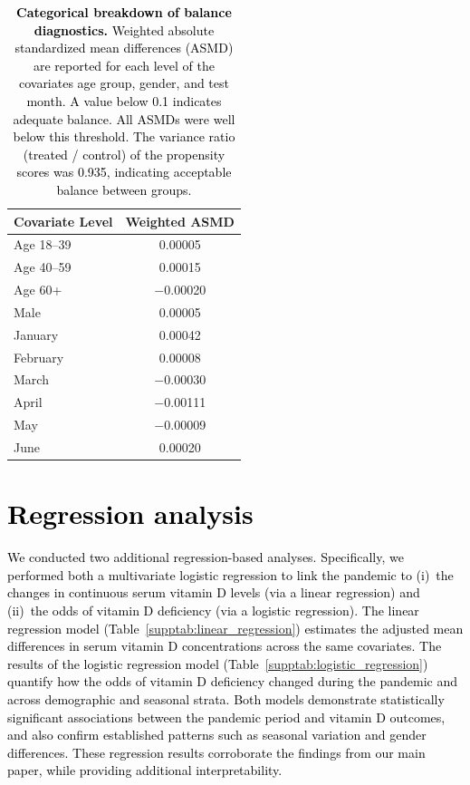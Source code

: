 \documentclass[12pt]{article}
\newcommand{\REV}[1]{\textcolor{black}{#1}}
\begin{document}
\begin{appendices}
\newpage
\begin{table}[htbp]
\centering
\caption[Categorical breakdown of balance diagnostics]{\textbf{\REV{Categorical breakdown of balance diagnostics.}} \REV{Weighted absolute standardized mean differences (ASMD) are reported for each level of the covariates age group, gender, and test month. A value below 0.1 indicates adequate balance. All ASMDs were well below this threshold. The variance ratio (treated / control) of the propensity scores was 0.935, indicating acceptable balance between groups.}}
\label{tab:balance_diagnostics}
\footnotesize
\begin{tabular}{|l|c|}
\hline
\rowcolor{orange!20}
\textbf{Covariate Level} & \textbf{Weighted ASMD} \\
\hline
Age 18--39& 0.00005 \\
Age 40--59& 0.00015 \\
Age 60+& $-$0.00020 \\
Male& 0.00005 \\
January& 0.00042 \\
February& 0.00008 \\
March& $-$0.00030 \\
April& $-$0.00111 \\
May& $-$0.00009 \\
June& 0.00020 \\
\hline
\end{tabular}
\end{table}


%
\newpage
\section{\REV{Regression analysis}}
\label{supp:linear_logistic_regression}

\REV{We conducted two additional regression-based analyses. Specifically, we performed both a multivariate logistic regression to link the pandemic to (i)~the changes in continuous serum vitamin D levels (via a linear regression) and (ii)~the odds of vitamin D deficiency (via a logistic regression). The linear regression model (Table~\ref{supptab:linear_regression}) estimates the adjusted mean differences in serum vitamin D concentrations across the same covariates. The results of the logistic regression model (Table~\ref{supptab:logistic_regression}) quantify how the odds of vitamin D deficiency changed during the pandemic and across demographic and seasonal strata. Both models demonstrate statistically significant associations between the pandemic period and vitamin D outcomes, and also confirm established patterns such as seasonal variation and gender differences. These regression results corroborate the findings from our main paper, while providing additional interpretability.}


\end{appendices}
\end{document}
